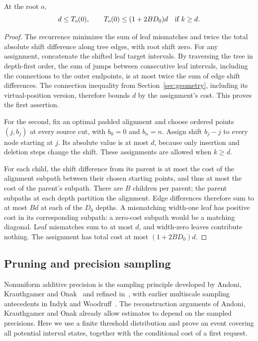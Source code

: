 \begin{lemma}\label{lem:shift-tree}
At the root $o$,
\[
 d\le T_o(0),\qquad
 T_o(0)\le(1+2BD_0)d\quad\hbox{if }k\ge d.
\]
\end{lemma}
\begin{proof}
The recurrence minimizes the sum of leaf mismatches and twice the total
absolute shift difference along tree edges, with root shift zero.  For any
assignment, concatenate the shifted leaf target intervals.  By traversing
the tree in depth-first order, the sum of jumps between consecutive leaf
intervals, including the connections to the outer endpoints, is at most
twice the sum of edge shift differences.  The connection inequality from
Section~\ref{sec:geometry}, including its virtual-position version, therefore
bounds $d$ by the assignment's cost.  This proves the first assertion.

For the second, fix an optimal padded alignment and choose ordered points
$(j,b_j)$ at every source cut, with $b_0=0$ and $b_n=n$.  Assign shift $b_j-j$
to every node starting at $j$.  Its absolute value is at most $d$, because
only insertion and deletion steps change the shift.  These assignments are
allowed when $k\ge d$.

For each child, the shift difference from its parent is at most the cost of
the alignment subpath between their chosen starting points, and thus at most
the cost of the parent's subpath.  There are $B$ children per parent; the
parent subpaths at each depth partition the alignment.  Edge differences
therefore sum to at most $Bd$ at each of the $D_0$ depths.  A mismatching
width-one leaf has positive cost in its corresponding subpath: a zero-cost
subpath would be a matching diagonal.  Leaf mismatches sum to at most $d$,
and width-zero leaves contribute nothing.  The assignment has total cost at
most $(1+2BD_0)d$.
\end{proof}

\subsection{Pruning and precision sampling}

Nonuniform additive precision is the sampling principle developed by
Andoni, Krauthgamer and Onak~\cite[Lemma~3.12]{AndoniKrauthgamerOnak2010}
and refined in~\cite[Lemma~1.2]{AndoniKrauthgamerOnak2011}, with earlier
multiscale sampling antecedents in Indyk and
Woodruff~\cite{IndykWoodruff2005}. The reconstruction arguments of Andoni,
Krauthgamer and Onak already allow estimates to depend on the sampled
precisions. Here we use a finite threshold
distribution and prove an event covering all potential interval states,
together with the conditional cost of a first request.

